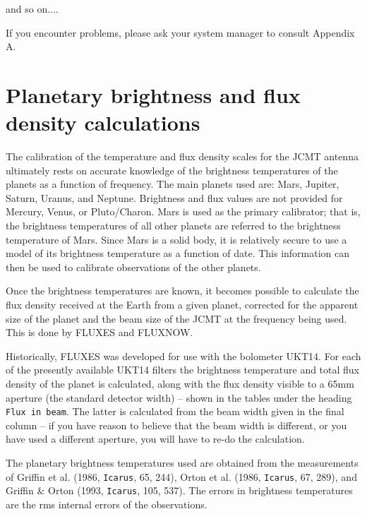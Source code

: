 \documentclass[11pt,twoside]{article}
\newcommand{\htmladdnormallink}[2]{#1}
\newcommand{\xlabel}[1]{}
\renewcommand{\_}{\texttt{\symbol{95}}}
\begin{document}
and so on....
  
If you encounter problems, please ask your system manager to consult 
Appendix A.

\section{Planetary brightness and flux density calculations}
\xlabel{PLANET}
\label{sec:planet}
   
The calibration of the temperature and flux density scales for the
\htmladdnormallink{JCMT}{http://www.jach.hawaii.edu/JCMT/home.html} antenna
ultimately rests on accurate knowledge of the brightness temperatures of the
planets as a function of frequency.
The main planets used are: Mars, Jupiter, Saturn, Uranus, and Neptune.
Brightness and flux values are not provided for Mercury, Venus, or Pluto/Charon.
Mars is used as the primary calibrator; that is, the brightness
temperatures of all other planets are referred to the brightness temperature of
Mars. Since Mars is a solid body, it is relatively secure to use a model of its
brightness temperature as a function of date. This information can then be used
to calibrate observations of the other planets. 
 
Once the brightness temperatures are known, it becomes possible to calculate 
the flux density received at the Earth from a given planet, corrected for the 
apparent size of the planet and the beam size of the 
\htmladdnormallink{JCMT}{http://www.jach.hawaii.edu/JCMT/home.html}
at the frequency being used.
This is done by FLUXES and FLUXNOW.

Historically, FLUXES was developed for use with the bolometer UKT14.
For each of the presently available UKT14 filters the brightness temperature
and total flux density of the planet is calculated, along with the flux density
visible to a 65mm aperture (the standard detector width) -- shown in the
tables under the heading {\tt{Flux in beam}}.
The latter is calculated from the beam width given in the final column -- if
you have reason to believe that the beam width is different, or you have used a
different aperture, you will have to re-do the calculation. 

The planetary brightness temperatures used are obtained from the measurements 
of Griffin et al. (1986, {\tt{Icarus}}, 65, 244), Orton et al. 
(1986, {\tt{Icarus}}, 67, 289),
and Griffin \& Orton (1993, {\tt{Icarus}}, 105, 537). The errors in brightness 
temperatures are the rms internal errors of the observations. 
\end{document}
